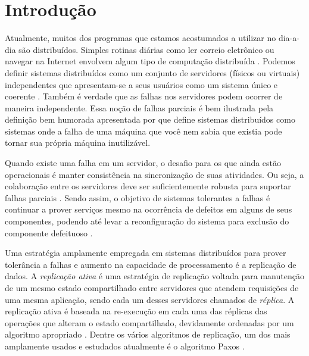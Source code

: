 \chapter*[Introdução]{Introdução}

Atualmente, muitos dos programas que estamos acostumados a utilizar no dia-a-dia são
distribuídos. Simples rotinas diárias como ler correio eletrônico ou navegar na Internet
envolvem algum tipo de computação distribuída \cite{cachin11}. Podemos definir sistemas
distribuídos como um conjunto de servidores (físicos ou virtuais) independentes que
apresentam-se a seus usuários como um sistema único e coerente \cite{tanenbaum07}. Também
é verdade que as falhas nos servidores podem ocorrer de maneira independente. Essa noção
de falhas parciais é bem ilustrada pela definição bem humorada apresentada por
 que define sistemas distribuídos como sistemas onde a falha de uma
máquina que você nem sabia que existia pode tornar sua própria máquina inutilizável.

Quando existe uma falha em um servidor, o desafio para os que ainda estão operacionais é
manter consistência na sincronização de suas atividades. Ou seja, a colaboração entre os
servidores deve ser suficientemente robusta para suportar falhas parciais \cite{cachin11}.
Sendo assim, o objetivo de sistemas tolerantes a falhas é continuar a prover serviços
mesmo na ocorrência de defeitos em alguns de seus componentes, podendo até levar a
reconfiguração do sistema para exclusão do componente defeituoso \cite{tanenbaum07}.

Uma estratégia amplamente empregada em sistemas distribuídos para prover tolerância a
falhas e aumento na capacidade de processamento é a replicação de dados. A
\emph{replicação ativa} \cite{schneider90} é uma estratégia de replicação voltada para
manutenção de um mesmo estado compartilhado entre servidores que atendem requisições de
uma mesma aplicação, sendo cada um desses servidores chamados de \emph{réplica}. A
replicação ativa é baseada na re-execução em cada uma das réplicas das operações que
alteram o estado compartilhado, devidamente ordenadas por um algoritmo apropriado
\cite{schneider90}. Dentre os vários algoritmos de replicação, um dos mais amplamente
usados e estudados atualmente é o algoritmo Paxos \cite{lamport98}.

